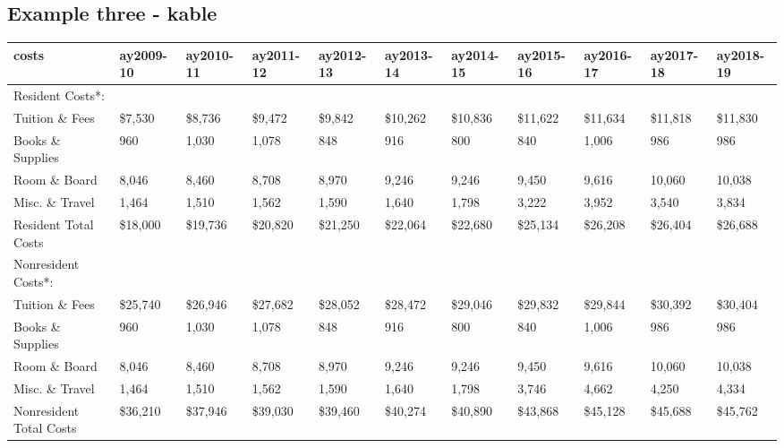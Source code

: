 \documentclass[
]{book}
\begin{document}
\hypertarget{example-three---kable}{%
\subsection{Example three - kable}\label{example-three---kable}}

\begin{tabular}{l|l|l|l|l|l|l|l|l|l|l}
\hline
costs & ay2009-10 & ay2010-11 & ay2011-12 & ay2012-13 & ay2013-14 & ay2014-15 & ay2015-16 & ay2016-17 & ay2017-18 & ay2018-19\\
\hline
Resident Costs*: &  &  &  &  &  &  &  &  &  & \\
\hline
Tuition \& Fees & \$7,530 & \$8,736 & \$9,472 & \$9,842 & \$10,262 & \$10,836 & \$11,622 & \$11,634 & \$11,818 & \$11,830\\
\hline
Books \& Supplies & 960 & 1,030 & 1,078 & 848 & 916 & 800 & 840 & 1,006 & 986 & 986\\
\hline
Room \& Board & 8,046 & 8,460 & 8,708 & 8,970 & 9,246 & 9,246 & 9,450 & 9,616 & 10,060 & 10,038\\
\hline
Misc. \& Travel & 1,464 & 1,510 & 1,562 & 1,590 & 1,640 & 1,798 & 3,222 & 3,952 & 3,540 & 3,834\\
\hline
Resident Total Costs & \$18,000 & \$19,736 & \$20,820 & \$21,250 & \$22,064 & \$22,680 & \$25,134 & \$26,208 & \$26,404 & \$26,688\\
\hline
Nonresident Costs*: &  &  &  &  &  &  &  &  &  & \\
\hline
Tuition \& Fees & \$25,740 & \$26,946 & \$27,682 & \$28,052 & \$28,472 & \$29,046 & \$29,832 & \$29,844 & \$30,392 & \$30,404\\
\hline
Books \& Supplies & 960 & 1,030 & 1,078 & 848 & 916 & 800 & 840 & 1,006 & 986 & 986\\
\hline
Room \& Board & 8,046 & 8,460 & 8,708 & 8,970 & 9,246 & 9,246 & 9,450 & 9,616 & 10,060 & 10,038\\
\hline
Misc. \& Travel & 1,464 & 1,510 & 1,562 & 1,590 & 1,640 & 1,798 & 3,746 & 4,662 & 4,250 & 4,334\\
\hline
Nonresident Total Costs & \$36,210 & \$37,946 & \$39,030 & \$39,460 & \$40,274 & \$40,890 & \$43,868 & \$45,128 & \$45,688 & \$45,762\\
\hline
\end{tabular}
\end{document}
